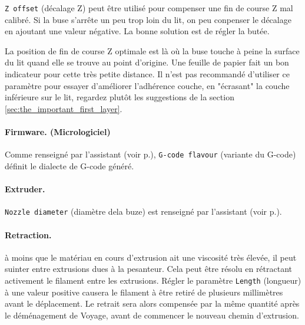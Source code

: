 \texttt{Z offset} (d\'ecalage Z) peut \^etre utilis\'e pour compenser une fin de course Z mal calibr\'e. Si la buse s'arr\^ete un peu trop loin du lit, on peu conpenser le d\'ecalage en ajoutant une valeur n\'egative. La bonne solution est de r\'egler la but\'ee.

La position de fin de course Z optimale est l\`a o\`u la buse touche \`a peine la surface du lit quand elle se trouve au point d'origine. Une feuille de papier fait un bon indicateur pour cette tr\`es petite distance. Il n'est pas recommand\'e d'utiliser ce param\`etre pour essayer d'am\'eliorer l'adh\'erence couche, en "\'ecrasant" la couche inf\'erieure sur le lit, regardez plut\^ot les suggestions de la section \ref{sec:the_important_first_layer}.

\paragraph{Firmware. (Micrologiciel)} %
\label{par:firmware}
Comme renseign\'e par l'assistant (voir p.\pageref{sub:1_firmware_type}), \texttt{G-code flavour} (variante du G-code) d\'efinit le dialecte de G-code g\'en\'er\'e.


\paragraph{Extruder.} %
\label{par:extruder}
\texttt{Nozzle diameter} (diam\`etre dela buze) est renseign\'e par l'assistant (voir p.\pageref{sub:3_nozzle_diameter}).

\paragraph{Retraction.} %
\label{par:retraction}
\`a moins que le mat\'eriau en cours d'extrusion ait une viscosit\'e tr\`es \'elev\'ee, il peut suinter entre extrusions dues \`a la pesanteur. Cela peut \^etre r\'esolu en r\'etractant activement le filament entre les extrusions.  R\'egler le param\`etre \texttt{Length} (longueur) \`a une valeur positive causera le filament \`a \^etre retir\'e de plusieurs millim\`etres avant le d\'eplacement. Le retrait sera alors compens\'ee par la m\^eme quantit\'e apr\`es le d\'em\'enagement de Voyage, avant de commencer le nouveau chemin d'extrusion.

